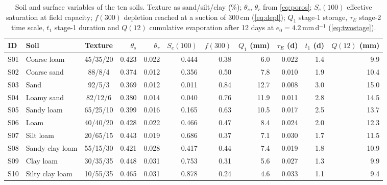 \documentclass[preprint,12pt]{elsarticle}
\begin{document}
\begin{table}[H]\centering\small
\caption{Soil and surface variables of the ten soils. Texture as sand/silt/clay (\%); $\theta_s$, $\theta_r$ from \cref{eq:poros}; $S_e(100)$ effective saturation at field capacity; $f(300)$ depletion reached at a suction of 300\,cm (\cref{eq:depl}); $Q_1$ stage-1 storage, $\tau_E$ stage-2 time scale, $t_1$ stage-1 duration and $Q(12)$ cumulative evaporation after 12 days at $e_0=4.2$\,mm\,d$^{-1}$ (\cref{eq:twostage}).}
\label{tab:swa-hyd}
\setlength{\tabcolsep}{3pt}\footnotesize
\begin{tabular}{llcrrrrrrrr}
\toprule
ID & Soil & Texture & $\theta_s$ & $\theta_r$ & $S_e(100)$ & $f(300)$ & $Q_1$ (mm) & $\tau_E$ (d) & $t_1$ (d) & $Q(12)$ (mm)\\\midrule
S01 & Coarse loam & 45/35/20 & 0.423 & 0.022 & 0.444 & 0.38 & 6.0 & 0.022 & 1.4 & 9.9\\
S02 & Coarse sand & 88/8/4 & 0.374 & 0.012 & 0.356 & 0.50 & 7.8 & 0.010 & 1.9 & 10.4\\
S03 & Sand & 92/5/3 & 0.369 & 0.012 & 0.011 & 0.84 & 12.7 & 0.008 & 3.0 & 15.0\\
S04 & Loamy sand & 82/12/6 & 0.380 & 0.014 & 0.040 & 0.76 & 11.9 & 0.011 & 2.8 & 14.5\\
S05 & Sandy loam & 65/25/10 & 0.399 & 0.016 & 0.165 & 0.63 & 10.5 & 0.017 & 2.5 & 13.7\\
S06 & Loam & 40/40/20 & 0.428 & 0.022 & 0.466 & 0.47 & 8.4 & 0.024 & 2.0 & 12.3\\
S07 & Silt loam & 20/65/15 & 0.443 & 0.019 & 0.686 & 0.37 & 7.1 & 0.030 & 1.7 & 11.5\\
S08 & Sandy clay loam & 55/15/30 & 0.421 & 0.028 & 0.417 & 0.44 & 7.4 & 0.019 & 1.8 & 10.9\\
S09 & Clay loam & 30/35/35 & 0.448 & 0.031 & 0.753 & 0.31 & 5.6 & 0.027 & 1.3 & 9.9\\
S10 & Silty clay loam & 10/55/35 & 0.465 & 0.031 & 0.878 & 0.24 & 4.6 & 0.033 & 1.1 & 9.4\\\bottomrule
\end{tabular}
\end{table}
\end{document}

